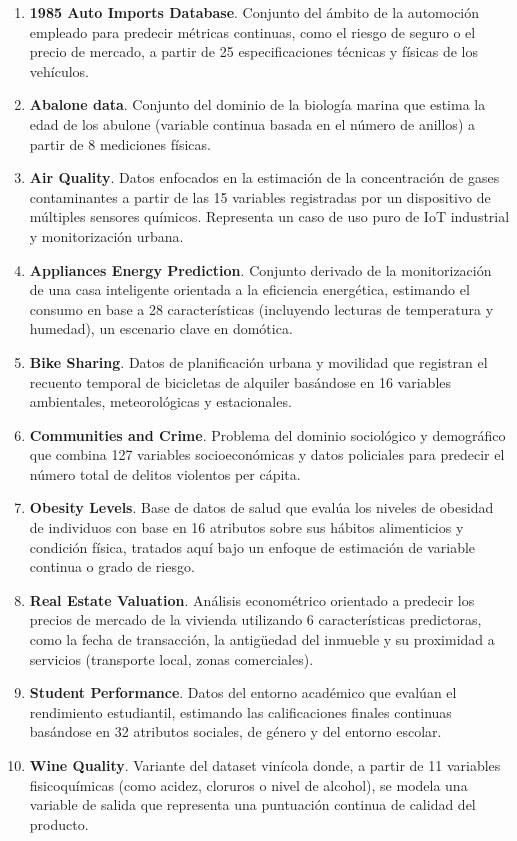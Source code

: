 \documentclass[a4paper,12pt,twoside,final]{book}
\begin{document}
\begin{enumerate}
  \item \textbf{1985 Auto Imports Database}. Conjunto del ámbito de la automoción empleado para predecir métricas
  continuas, como el riesgo de seguro o el precio de mercado, a partir de 25 especificaciones técnicas y físicas de
  los vehículos.
  \item \textbf{Abalone data}. Conjunto del dominio de la biología marina que estima la edad de los abulone (variable
  continua basada en el número de anillos) a partir de 8 mediciones físicas.
  \item \textbf{Air Quality}. Datos enfocados en la estimación de la concentración de gases contaminantes a partir de
  las 15 variables registradas por un dispositivo de múltiples sensores químicos. Representa un caso de uso puro de
  IoT industrial y monitorización urbana.
  \item \textbf{Appliances Energy Prediction}. Conjunto derivado de la monitorización de una casa inteligente
  orientada a la eficiencia energética, estimando el consumo en base a 28 características (incluyendo lecturas de
  temperatura y humedad), un escenario clave en domótica.
  \item \textbf{Bike Sharing}. Datos de planificación urbana y movilidad que registran el recuento temporal de
  bicicletas de alquiler basándose en 16 variables ambientales, meteorológicas y estacionales.
  \item \textbf{Communities and Crime}. Problema del dominio sociológico y demográfico que combina 127 variables
  socioeconómicas y datos policiales para predecir el número total de delitos violentos per cápita.
  \item \textbf{Obesity Levels}. Base de datos de salud que evalúa los niveles de obesidad de individuos con base en
  16 atributos sobre sus hábitos alimenticios y condición física, tratados aquí bajo un enfoque de estimación de
  variable continua o grado de riesgo.
  \item \textbf{Real Estate Valuation}. Análisis econométrico orientado a predecir los precios de mercado de la
  vivienda utilizando 6 características predictoras, como la fecha de transacción, la antigüedad del inmueble y su
  proximidad a servicios (transporte local, zonas comerciales).
  \item \textbf{Student Performance}. Datos del entorno académico que evalúan el rendimiento estudiantil, estimando
  las calificaciones finales continuas basándose en 32 atributos sociales, de género y del entorno escolar.
  \item \textbf{Wine Quality}. Variante del dataset vinícola donde, a partir de 11 variables fisicoquímicas (como
  acidez, cloruros o nivel de alcohol), se modela una variable de salida que representa una puntuación continua de
  calidad del producto.
\end{enumerate}
\end{document}
